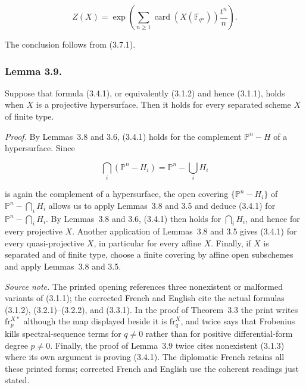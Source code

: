 \begin{equation}\tag{3.8.3}
Z(X)=\exp\!\left(
\sum_{n\geq1}\operatorname{card}(X(\mathbb F_{q^n}))\frac{t^n}{n}
\right).
\end{equation}

The conclusion follows from (3.7.1).

\subsubsection*{Lemma 3.9.}
Suppose that formula (3.4.1), or equivalently (3.1.2) and hence (3.1.1), holds
when $X$ is a projective hypersurface. Then it holds for every separated
scheme $X$ of finite type.

\medskip
\noindent\emph{Proof.}
By Lemmas~3.8 and 3.6, (3.4.1) holds for the complement
$\mathbb P^n-H$ of a hypersurface. Since

\[
\bigcap_i(\mathbb P^n-H_i)=\mathbb P^n-\bigcup_iH_i
\]

is again the complement of a hypersurface, the open covering
$\{\mathbb P^n-H_i\}$ of $\mathbb P^n-\bigcap_iH_i$ allows us to apply
Lemmas~3.8 and 3.5 and deduce (3.4.1) for
$\mathbb P^n-\bigcap_iH_i$. By Lemmas~3.8 and 3.6, (3.4.1) then holds for
$\bigcap_iH_i$, and hence for every projective $X$. Another application of
Lemmas~3.8 and 3.5 gives (3.4.1) for every quasi-projective $X$, in particular
for every affine $X$. Finally, if $X$ is separated and of finite type, choose
a finite covering by affine open subschemes and apply Lemmas~3.8 and 3.5.

\medskip
\noindent\emph{Source note.}
The printed opening references three nonexistent or malformed variants of
(3.1.1); the corrected French and English cite the actual formulas (3.1.2),
(3.2.1)--(3.2.2), and (3.3.1). In the proof of Theorem~3.3 the print writes
$\mathrm{fr}_p^{X*}$ although the map displayed beside it is
$\mathrm{fr}_q^X$, and twice says that Frobenius kills spectral-sequence terms
for $q\ne0$ rather than for positive differential-form degree $p\ne0$.
Finally, the proof of Lemma~3.9 twice cites nonexistent (3.1.3) where its own
argument is proving (3.4.1). The diplomatic French retains all these printed
forms; corrected French and English use the coherent readings just stated.

